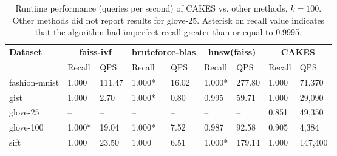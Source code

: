 \begin{table*}[!t]
    \caption{Runtime performance (queries per second) of CAKES vs. other methods, $k=100$. Other methods did not report results for glove-25. Asterisk on recall value indicates that the algorithm had imperfect recall greater than or equal to 0.9995.}
    \label{table:results:ann-100}
    \vskip 0.15in
    \begin{center}
        \begin{small}
            \begin{sc}
                \begin{tabular}{|l|p{1cm}|p{1cm}|p{1cm}|p{1cm}|p{1cm}|p{1cm}|p{1cm}|p{1cm}|}
                    \hline
                    \textbf{Dataset}  & \multicolumn{2}{|c|}{\textbf{faiss-ivf}} & \multicolumn{2}{|c|}{\textbf{bruteforce-blas}} & \multicolumn{2}{|c|}{\textbf{hnsw(faiss)}} & \multicolumn{2}{|c|}{\textbf{CAKES}} \\
                    &                    Recall & QPS  & Recall & QPS     & Recall & QPS      & Recall & QPS \\
                    \hline
                    fashion-mnist  & 1.000 & 111.47    & 1.000* & 16.02   & 1.000* & 277.80   & 1.000 & 71,370 \\ 
                    \hline
                    gist           & 1.000 & 2.70      & 1.000* & 0.80    & 0.995 & 59.71     & 1.000 & 29,090 \\
                    \hline
                    glove-25       & -- & --           & --     & --      & -- & --           & 0.851 & 49,350 \\
                    \hline
                    glove-100      & 1.000* &  19.04   & 1.000* & 7.52    & 0.987 & 92.58     & 0.905 & 4,384 \\
                    \hline
                    sift           & 1.000 &  23.50    & 1.000  & 6.51    & 1.000* & 179.14   & 1.000 & 147,400 \\                                                 
                    \hline
                \end{tabular}
            \end{sc}
        \end{small}
    \end{center}
    \vskip -0.1in
\end{table*}


